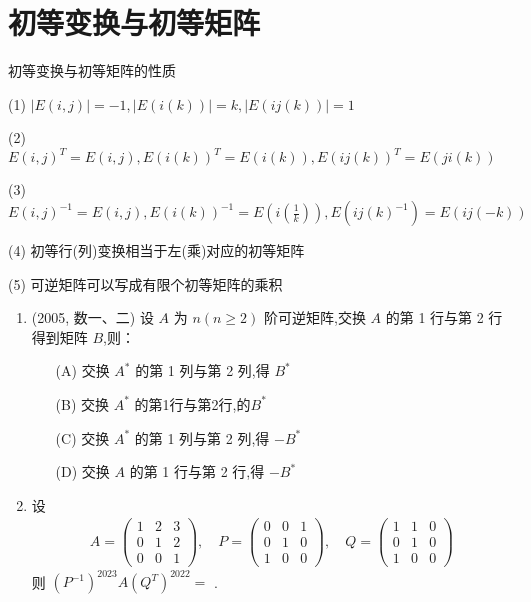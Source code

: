 \documentclass[12pt, a4paper, oneside, UTF8]{ctexbook}
\begin{document}
\section{初等变换与初等矩阵}
\begin{remark}
    初等变换与初等矩阵的性质
    \item [(1)] $\left|E(i,j)\right|=-1,\left|E(i(k))\right|=k,\left|E(ij(k))\right|=1$
    \item [(2)] $E(i, j)^T=E(i,j),E(i(k))^T=E(i(k)),E(ij(k))^T=E(ji(k))$
    \item [(3)] $E(i,j)^{-1}=E(i,j),E(i(k))^{-1}=E(i(\frac{1}{k})),E(ij(k)^{-1})=E(ij(-k))$
    \item [(4)] 初等行(列)变换相当于左(乘)对应的初等矩阵
    \item [(5)] 可逆矩阵可以写成有限个初等矩阵的乘积
\end{remark}
\begin{enumerate}[label=\arabic*.,start=11]
    \item (2005, 数一、二) 设 $ A $ 为 $ n(n \geq 2) $ 阶可逆矩阵,交换 $ A $ 的第 1 行与第 2 行得到矩阵 $ B $,则：
    \begin{enumerate}
        \item [(A)] 交换 $ A^* $ 的第 1 列与第 2 列,得 $ B^* $
        \item [(B)] 交换 $ A^* $ 的第1行与第2行,的$B^*$
        \item [(C)] 交换 $ A^* $ 的第 1 列与第 2 列,得 $ -B^* $
        \item [(D)] 交换 $ A $ 的第 1 行与第 2 行,得 $ -B^* $
    \end{enumerate}
    
    \begin{solution}
    \newpage
    \end{solution}
    
    \item 设 
    \begin{align*}
    A = \begin{pmatrix}
    1 & 2 & 3 \\
    0 & 1 & 2 \\
    0 & 0 & 1  
    \end{pmatrix}, \quad
    P = \begin{pmatrix}
    0 & 0 & 1 \\
    0 & 1 & 0 \\
    1 & 0 & 0 
    \end{pmatrix}, \quad
    Q = \begin{pmatrix}
    1 & 1 & 0 \\
    0 & 1 & 0 \\
    1 & 0 & 0
    \end{pmatrix}
    \end{align*}
    则 $ (P^{-1})^{2023} A (Q^T)^{2022} = $ \underline{\hspace{3cm}}.
    
    \begin{solution}
    \newpage
    \end{solution}
\end{enumerate}

\ifx\allfiles\undefined
\end{document}

